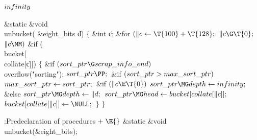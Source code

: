 \Y\B\4\D$\\{infinity}$ \5
\par
\Y\B\1\1\&{static} \&{void} \\{unbucket}(\6
\&{eight\_bits} \|d)\2\2\6
${}\{{}$\1\6
\&{int} \|c;\7
\&{for} ${}(\|c\K\T{100}+\T{128};{}$ ${}\|c\G\T{0};{}$ ${}\|c\MM){}$\1\6
\&{if} (\\{bucket}[\\{collate}[\|c]])\5
${}\{{}$\1\6
\&{if} ${}(\\{sort\_ptr}\G\\{scrap\_info\_end}){}$\1\5
\\{overflow}(\.{"sorting"});\2\6
${}\\{sort\_ptr}\PP;{}$\6
\&{if} ${}(\\{sort\_ptr}>\\{max\_sort\_ptr}){}$\1\5
${}\\{max\_sort\_ptr}\leftarrow\\{sort\_ptr};{}$\2\6
\&{if} ${}(\|c\E\T{0}){}$\1\5
${}\\{sort\_ptr}\MG\\{depth}\K\\{infinity};{}$\2\6
\&{else}\1\5
${}\\{sort\_ptr}\MG\\{depth}\K\|d;{}$\2\6
${}\\{sort\_ptr}\MG\\{head}\K\\{bucket}[\\{collate}[\|c]];{}$\6
${}\\{bucket}[\\{collate}[\|c]]\K\NULL;{}$\6
\4${}\}{}$\2\2\6
\4${}\}{}$\2\par
\fi

\B{}:Predeclaration of procedures\X${}\mathrel+\E{}$\5
\&{static} \&{void} \\{unbucket}(\&{eight\_bits});\par
\fi

